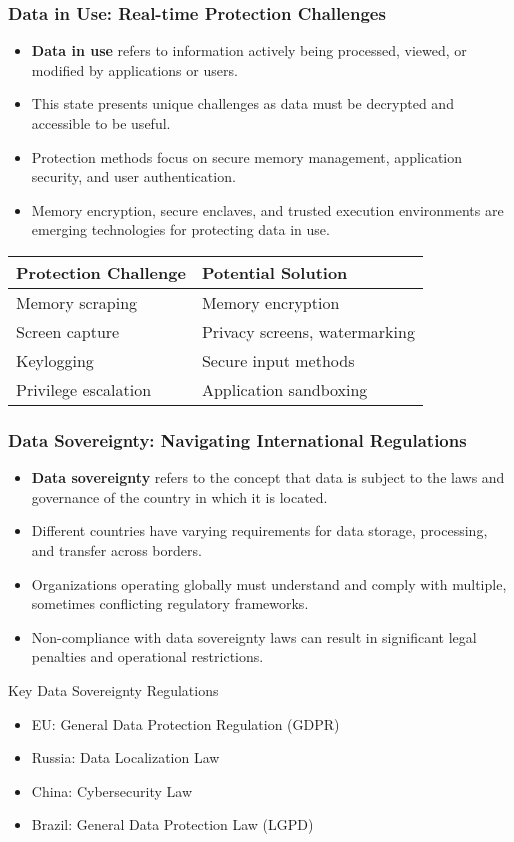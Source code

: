 \documentclass{beamer}
\begin{document}
\begin{frame}
\frametitle{Data in Use: Real-time Protection Challenges}
\begin{itemize}
\item \textbf{Data in use} refers to information actively being processed, viewed, or modified by applications or users.
\item This state presents unique challenges as data must be decrypted and accessible to be useful.
\item Protection methods focus on secure memory management, application security, and user authentication.
\item Memory encryption, secure enclaves, and trusted execution environments are emerging technologies for protecting data in use.
\end{itemize}

\begin{table}
\begin{tabular}{|l|l|}
\hline
\textbf{Protection Challenge} & \textbf{Potential Solution} \\
\hline
Memory scraping & Memory encryption \\
\hline
Screen capture & Privacy screens, watermarking \\
\hline
Keylogging & Secure input methods \\
\hline
Privilege escalation & Application sandboxing \\
\hline
\end{tabular}
\end{table}
\end{frame}

\begin{frame}
\frametitle{Data Sovereignty: Navigating International Regulations}
\begin{itemize}
\item \textbf{Data sovereignty} refers to the concept that data is subject to the laws and governance of the country in which it is located.
\item Different countries have varying requirements for data storage, processing, and transfer across borders.
\item Organizations operating globally must understand and comply with multiple, sometimes conflicting regulatory frameworks.
\item Non-compliance with data sovereignty laws can result in significant legal penalties and operational restrictions.
\end{itemize}

\begin{block}{Key Data Sovereignty Regulations}
\begin{itemize}
    \item EU: General Data Protection Regulation (GDPR)
    \item Russia: Data Localization Law
    \item China: Cybersecurity Law
    \item Brazil: General Data Protection Law (LGPD)
\end{itemize}
\end{block}
\end{frame}
\end{document}
